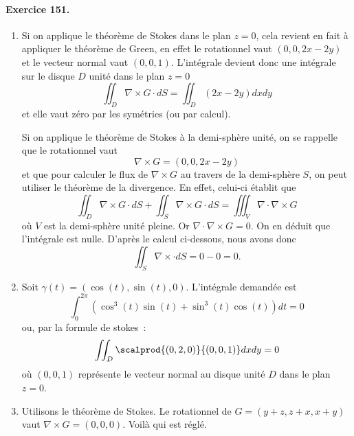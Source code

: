 \paragraph{Exercice 151.}
\begin{enumerate}

\item Si on applique le théorème de Stokes dans le plan $z = 0$, cela revient en fait à appliquer le théorème de Green, en effet le rotationnel vaut $(0, 0, 2 x - 2 y)$ et le vecteur normal vaut $(0,0,1)$. L'intégrale devient donc une intégrale sur le disque $D$ unité dans le plan $z = 0$
\begin{equation*}
\iint_D \nabla\times G \cdot d S = \iint_D (2x - 2 y) d x d y
\end{equation*}
et elle vaut zéro par les symétries (ou par calcul).

Si on applique le théorème de Stokes à la demi-sphère unité, on se rappelle que le rotationnel vaut
\begin{equation*}
\nabla\times G = (0, 0, 2x - 2 y)
\end{equation*}
et que pour calculer le flux de $\nabla\times G$ au travers de la demi-sphère $S$, on peut utiliser le théorème de la divergence. En effet, celui-ci établit que
\begin{equation*}
\iint_D \nabla\times G \cdot d S + \iint_S \nabla\times G \cdot d S = \iiint_V
\nabla\cdot \nabla\times G
\end{equation*}
où $V$ est la demi-sphère unité pleine. Or $\nabla\cdot\nabla\times G = 0$. On en
déduit que l'intégrale est nulle. D'après le calcul ci-dessous, nous
avons donc
\begin{equation*}
\iint_S \nabla\times \cdot d S = 0 - 0 = 0.
\end{equation*}

\item Soit $\gamma(t) = (\cos(t), \sin(t), 0)$. L'intégrale demandée
est
\begin{equation*}
\int_0^{2\pi} (\cos^3(t) \sin(t) + \sin^3(t) \cos(t)) d t = 0
\end{equation*}
ou, par la formule de stokes~:
\begin{equation*}
\iint_D \scalprod{(0,2,0)}{(0,0,1)} d x d y = 0
\end{equation*}
où $(0,0,1)$ représente le vecteur normal au disque unité $D$ dans
le plan $z = 0$.

\item Utilisons le théorème de Stokes. Le rotationnel de $G =
(y+z,z+x,x+y)$ vaut $\nabla\times G = (0,0,0)$. Voilà qui est réglé.


\end{enumerate}
